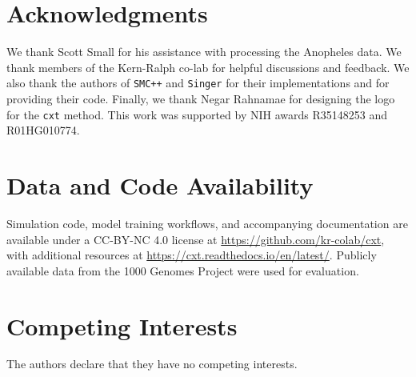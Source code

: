 \documentclass{article}
\newcommand{\cxtkit}{\texttt{cxt}\xspace}
\newcommand{\singer}{\texttt{Singer}\xspace}
\newcommand{\smcpp}{\texttt{SMC++}\xspace}
\begin{document}
\section*{Acknowledgments}
We thank Scott Small for his assistance with processing the Anopheles data.
We thank members of the Kern-Ralph co-lab for helpful discussions and feedback.
We also thank the authors of \smcpp and \singer for their implementations and for providing their code. Finally, we thank Negar Rahnamae for designing the logo for the \cxtkit method.
This work was supported by NIH awards R35148253 and R01HG010774.

\section*{Data and Code Availability}
Simulation code, model training workflows, and accompanying documentation are available under a CC-BY-NC 4.0 license at \url{https://github.com/kr-colab/cxt}, with additional resources at \url{https://cxt.readthedocs.io/en/latest/}. Publicly available data from the 1000 Genomes Project were used for evaluation.
 



\section*{Competing Interests}

The authors declare that they have no competing interests.


\newpage
%

\printbibliography
\end{document}
